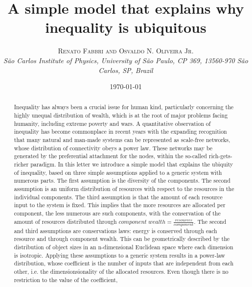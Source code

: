 \documentclass[a4paper, 11pt]{article} %
\title{\textbf{A simple model that explains why inequality is ubiquitous}\\ %
} %
\author{\textsc{Renato Fabbri and Osvaldo N. Oliveira Jr.} %
\\{\textit{São Carlos Institute of Physics, University of São Paulo, CP 369, 13560-970 São Carlos, SP, Brazil}}} %
\date{\today} %
\makeatletter
\renewcommand{\maketitle}{ %
\begin{flushright} %
{\LARGE\@title} %

\vspace{5pt} %

{\large\@author} %
\\\@date %

\vspace{1pt} %
\end{flushright}
}
\makeatother
\begin{document}
\maketitle %



%
\begin{abstract}
	Inequality has always been a crucial issue for human kind, particularly concerning the highly unequal distribution of wealth, which is at the root of major problems facing humanity, including extreme poverty and wars.
	A quantitative observation of inequality has become commonplace in recent years
	with the expanding recognition that many natural and man-made systems can be represented as scale-free networks,
	whose distribution of connectivity obeys a power law.
	These networks may be generated by the preferential attachment for the nodes, within the so-called rich-gets-richer paradigm.
	In this letter we introduce a simple model that explains the ubiquity of inequality, based on three simple assumptions applied to a generic system with numerous parts.
	The first assumption is the diversity of the components.
	The second assumption is an uniform distribution of resources with respect to the resources in the individual components.
	The third assumption is that the amount of each resource input to the system is fixed.
	This implies that the more resources are allocated per component, the less numerous are such components,
	with the conservation of the amount of resources distributed through $component\; wealth = \frac{resources}{component}$.
	The second and third assumptions are conservations laws: energy is conserved through each resource and through component wealth.
	This can be geometrically described by the distribution of object sizes in an n-dimensional Euclidean space where each dimension is isotropic.
	Applying these assumptions to a generic system results in a power-law distribution, whose coefficient is the number of inputs that are independent from each other, i.e. the dimensionsionality of the allocated resources.
	Even though there is no restriction to the value of the coefficient,

\end{abstract}
\end{document}
